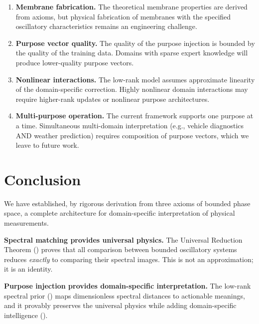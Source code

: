 \documentclass[11pt,twocolumn,a4paper]{article}
\theoremstyle{definition}
\theoremstyle{remark}
\begin{document}
\begin{enumerate}
    \item \textbf{Membrane fabrication.}  The theoretical membrane properties are derived from axioms, but physical fabrication of membranes with the specified oscillatory characteristics remains an engineering challenge.

    \item \textbf{Purpose vector quality.}  The quality of the purpose injection is bounded by the quality of the training data.  Domains with sparse expert knowledge will produce lower-quality purpose vectors.

    \item \textbf{Nonlinear interactions.}  The low-rank model assumes approximate linearity of the domain-specific correction.  Highly nonlinear domain interactions may require higher-rank updates or nonlinear purpose architectures.

    \item \textbf{Multi-purpose operation.}  The current framework supports one purpose at a time.  Simultaneous multi-domain interpretation (e.g., vehicle diagnostics AND weather prediction) requires composition of purpose vectors, which we leave to future work.
\end{enumerate}


\section{Conclusion}\label{sec:conclusion}

We have established, by rigorous derivation from three axioms of bounded phase space, a complete architecture for domain-specific interpretation of physical measurements.

\textbf{Spectral matching provides universal physics.}  The Universal Reduction Theorem () proves that all comparison between bounded oscillatory systems reduces \emph{exactly} to comparing their spectral images.  This is not an approximation; it is an identity.

\textbf{Purpose injection provides domain-specific interpretation.}  The low-rank spectral prior () maps dimensionless spectral distances to actionable meanings, and it provably preserves the universal physics while adding domain-specific intelligence ().
\end{document}
